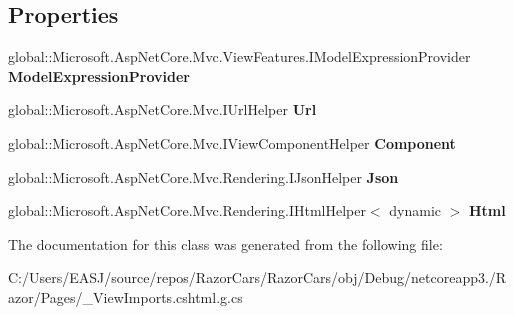 \subsection*{Properties}
\begin{DoxyCompactItemize}
\item 
\mbox{\label{class_razor_cars_1_1_pages_1_1_pages_____view_imports_a5c6e6076f0934cbf0c94c8c258afd549}} 
global\+::\+Microsoft.\+Asp\+Net\+Core.\+Mvc.\+View\+Features.\+I\+Model\+Expression\+Provider {\bfseries Model\+Expression\+Provider}
\item 
\mbox{\label{class_razor_cars_1_1_pages_1_1_pages_____view_imports_a8e35af311bd7ca9b30718c98e2929d2e}} 
global\+::\+Microsoft.\+Asp\+Net\+Core.\+Mvc.\+I\+Url\+Helper {\bfseries Url}
\item 
\mbox{\label{class_razor_cars_1_1_pages_1_1_pages_____view_imports_adc23f706bf17bdc7dbe0207b8364fb74}} 
global\+::\+Microsoft.\+Asp\+Net\+Core.\+Mvc.\+I\+View\+Component\+Helper {\bfseries Component}
\item 
\mbox{\label{class_razor_cars_1_1_pages_1_1_pages_____view_imports_a8339da60ca3f412c8811bf88270d3d3a}} 
global\+::\+Microsoft.\+Asp\+Net\+Core.\+Mvc.\+Rendering.\+I\+Json\+Helper {\bfseries Json}
\item 
\mbox{\label{class_razor_cars_1_1_pages_1_1_pages_____view_imports_ad6d6848ef37ae06398851dde98e39bfb}} 
global\+::\+Microsoft.\+Asp\+Net\+Core.\+Mvc.\+Rendering.\+I\+Html\+Helper$<$ dynamic $>$ {\bfseries Html}
\end{DoxyCompactItemize}


The documentation for this class was generated from the following file\+:\begin{DoxyCompactItemize}
\item 
C\+:/\+Users/\+E\+A\+S\+J/source/repos/\+Razor\+Cars/\+Razor\+Cars/obj/\+Debug/netcoreapp3./\+Razor/\+Pages/\+\_\+\+View\+Imports.\+cshtml.\+g.\+cs\end{DoxyCompactItemize}
